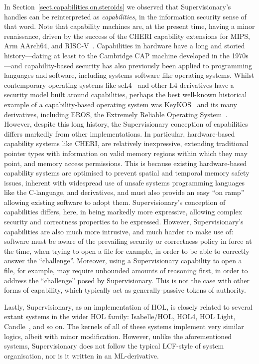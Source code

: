 \documentclass[a4paper, UKenglish, cleveref, autoref, thm-restate, colorlinks]{lipics-v2021}
\begin{document}
In Section~\ref{sect.capabilities.on.steroids} we observed that Supervisionary's handles can be reinterpreted as \emph{capabilities}, in the information security sense of that word.
Note that capability machines are, at the present time, having a minor renaissance, driven by the success of the CHERI capability extensions for MIPS, Arm AArch64, and RISC-V~\cite{DBLP:conf/sp/NienhuisJBFR0NN20}.
Capabilities in hardware have a long and storied history---dating at least to the Cambridge CAP machine developed in the 1970s---and capability-based security has also previously been applied to programming languages and software, including systems software like operating systems.
Whilst contemporary operating systems like seL4~\cite{DBLP:conf/sosp/KleinEHACDEEKNSTW09} and other L4 derivatives have a security model built around capabilities, perhaps the best well-known historical example of a capability-based operating system was KeyKOS~\cite{DBLP:conf/sp/RajunasHBFL86, DBLP:journals/sigops/Hardy85} and its many derivatives, including EROS, the Extremely Reliable Operating System~\cite{DBLP:journals/software/ShapiroH02}.
However, despite this long history, the Supervisionary conception of capabilities differs markedly from other implementations.
In particular, hardware-based capability systems like CHERI, are relatively inexpressive, extending traditional pointer types with information on valid memory regions within which they may point, and memory access permissions.
This is because existing hardware-based capability systems are optimised to prevent spatial and temporal memory safety issues, inherent with widespread use of unsafe systems programming languages like the C-language, and derivatives, and must also provide an easy ``on ramp'' allowing existing software to adopt them.
Supervisionary's conception of capabilities differs, here, in being markedly more expressive, allowing complex security and correctness properties to be expressed.
However, Supervisionary's capabilities are also much more intrusive, and much harder to make use of: software must be aware of the prevailing security or correctness policy in force at the time, when trying to open a file for example, in order to be able to correctly answer the ``challenge''.
Moreover, using a Supervisionary capability to open a file, for example, may require unbounded amounts of reasoning first, in order to address the ``challenge'' posed by Supervisionary.
This is not the case with other forms of capability, which typically act as generally-passive tokens of authority.

Lastly, Supervisionary, as an implementation of HOL, is closely related to several extant systems in the wider HOL family: Isabelle/HOL, HOL4, HOL Light, Candle~\cite{DBLP:conf/itp/AbrahamssonMKS22}, and so on.
The kernels of all of these systems implement very similar logics, albeit with minor modification.
However, unlike the aforementioned systems, Supervisionary does not follow the typical LCF-style of system organisation, nor is it written in an ML-derivative.
\end{document}
